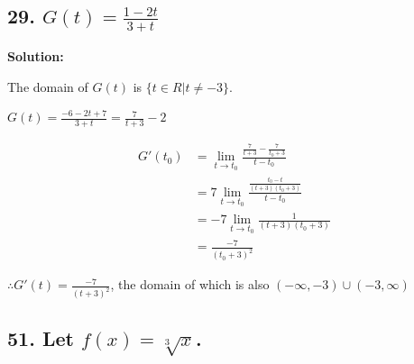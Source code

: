 \documentclass{article}
\newenvironment{solution}{
    \par \textbf{Solution: } \quad \par
}{\par}
\begin{document}
    \subsection*{29. $G(t) = \frac{1 - 2t}{3 + t}$}

    \begin{solution}
        The domain of $G(t)$ is $\{ t \in R | t \not = -3 \}$.
        
        $G(t) = \frac{-6 - 2t + 7}{3 + t} = \frac{7}{t + 3} - 2$

        $$
        \begin{aligned}
            G'(t_0) &= \lim_{t \to t_0}\frac{\frac{7}{t + 3} - \frac{7}{t_0 + 3}}{t - t_0} \\
            &= 7 \lim_{t \to t_0}\frac{\frac{t_0 - t}{(t + 3)(t_0 + 3)}}{t - t_0} \\
            &= -7 \lim_{t \to t_0}\frac{1}{(t + 3)(t_0 + 3)} \\
            &= \frac{-7}{(t_0 + 3)^2}
        \end{aligned}
        $$

        $\therefore G'(t) = \frac{-7}{(t + 3)^2}$, the domain of which is also $(-\infty, -3) \cup (-3, \infty)$
    \end{solution}

    \subsection*{51. Let $f(x) = \sqrt[3]x$.}
\end{document}
